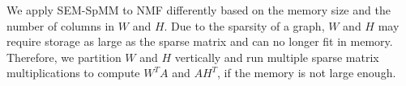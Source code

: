We apply SEM-SpMM to NMF differently
based on the memory size and the number of columns in $W$ and $H$. Due to
the sparsity of a graph, $W$ and $H$ may require storage as large as
the sparse matrix and can no longer fit in
memory. Therefore, we partition $W$ and $H$ vertically and run multiple
sparse matrix multiplications to compute $W^TA$ and $AH^T$, if the memory is not
large enough.

